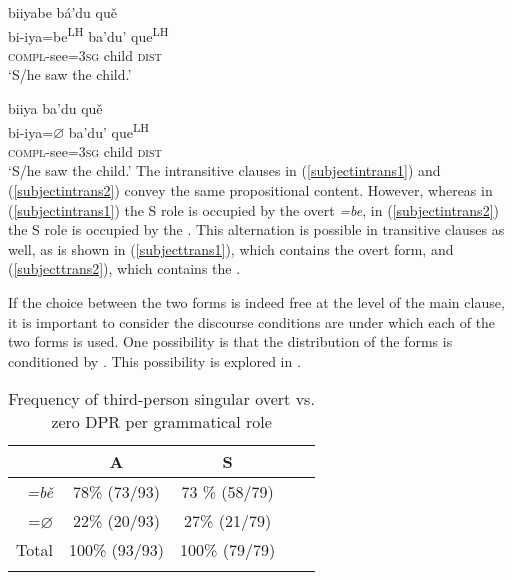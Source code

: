 \ea \label{subjecttrans1} 
\glll biiyabe b\'{a}'du qu\v{e}  \\
bi-iya=be\textsuperscript{LH} ba'du' que\textsuperscript{LH}  \\
\textsc{compl}-see=3\textsc{sg} child \textsc{dist}  \\
\glt `S/he saw the child.' 
\z

\ea \label{subjecttrans2} 
\glll biiya ba'du qu\v{e} \\
bi-iya=$\varnothing$ ba'du' que\textsuperscript{LH} \\
\textsc{compl}-see=3\textsc{sg} child \textsc{dist} \\
\glt `S/he saw the child.' 
\z
The intransitive clauses in (\ref{subjectintrans1}) and (\ref{subjectintrans2}) convey the same propositional content. However, whereas in (\ref{subjectintrans1}) the S role is occupied by the overt  \textit{=be}, in (\ref{subjectintrans2}) the S role is occupied by the . This alternation is possible in transitive clauses as well, as is shown in (\ref{subjecttrans1}), which contains the overt form, and (\ref{subjecttrans2}), which contains the . 

If the choice between the two forms is indeed free at the level of the main clause, it is important to consider the discourse conditions are under which each of the two forms is used. One possibility is that the distribution of the forms is conditioned by . This possibility is explored in .

\begin{table}

\caption{{Frequency of third-person singular overt vs. zero DPR per grammatical role}}
\begin{tabular}{ r  c  c  c  c }
\lsptoprule
 & A & S \\

\midrule
\textit{=b\v{e}} &  78{\%} (73/93) & 73 {\%} (58/79) \\

\textsc{=$\varnothing$} &  22{\%} (20/93)  &  27{\%} (21/79) \\

\midrule
Total&  100{\%} (93/93) &  100{\%} (79/79)  \\

\lspbottomrule
\end{tabular}\\
\label{overtvszero}

\end{table}

